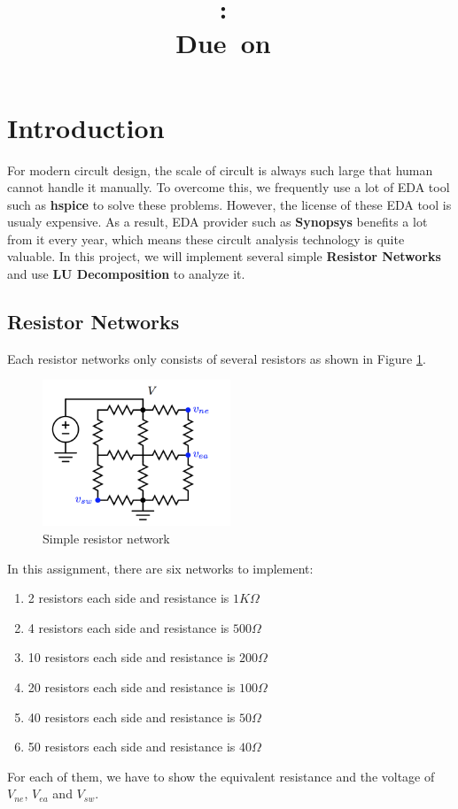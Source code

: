 \documentclass{article}
\title{
    \vspace{2in}
    \textmd{\textbf{\hmwkClass:\ \hmwkTitle}}\\
    \normalsize\vspace{0.1in}\small{Due\ on\ \hmwkDueDate}\\
    \vspace{3in}
}
\author{\textbf{\hmwkAuthorName}}
\date{} %
\begin{document}
\maketitle
\newpage


\section{Introduction}
For modern circult design, the scale of circult is always such large that human cannot handle it manually. To overcome this, 
we frequently use a lot of EDA tool such as \textbf{hspice} to solve these problems. However, the license of these EDA tool is 
usualy expensive. As a result, EDA provider such as \textbf{Synopsys} benefits a lot from it every year, which means these
circult analysis technology is quite valuable. \newline
In this project, we will implement several simple \textbf{Resistor Networks} and use \textbf{LU Decomposition} to analyze it.
\subsection{Resistor Networks}
Each resistor networks only consists of several resistors as shown in Figure \ref{fig:resistor_network}.
\begin{figure}[H]
    \centering
    \includegraphics[width=0.5\textwidth]{src/resistor_network.png}
    \caption{Simple resistor network}
    \label{fig:resistor_network}
\end{figure}
In this assignment, there are six networks to implement:
\begin{enumerate}
    \item 2 resistors each side and resistance is $1K\Omega$
    \item 4 resistors each side and resistance is $500\Omega$
    \item 10 resistors each side and resistance is $200\Omega$
    \item 20 resistors each side and resistance is $100\Omega$
    \item 40 resistors each side and resistance is $50\Omega$
    \item 50 resistors each side and resistance is $40\Omega$
\end{enumerate}
For each of them, we have to show the equivalent resistance and the voltage of $V_{ne}$, $V_{ea}$ and $V_{sw}$.
\newpage
\end{document}
